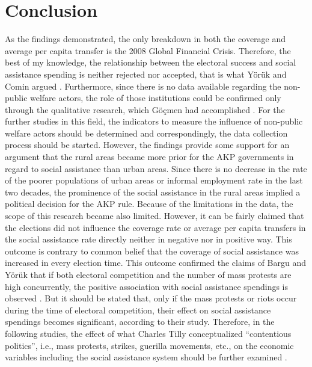\documentclass[11pt]{article}
\begin{document}
\section{Conclusion}

\noindent As the findings demonstrated, the only breakdown in both the coverage and average per capita transfer is the 2008 Global Financial Crisis. Therefore, the best of my knowledge, the relationship between the electoral success and social assistance spending is neither rejected nor accepted, that is what Yörük and Comin argued \cite{yoruk2020electoral}. Furthermore, since there is no data available regarding the non-public welfare actors, the role of those institutions could be confirmed only through the qualitative research, which Göçmen had accomplished \cite{goccmen2018non}. For the further studies in this field, the indicators to measure the influence of non-public welfare actors should be determined and correspondingly, the data collection process should be started. However, the findings provide some support for an argument that the rural areas became more prior for the AKP governments in regard to social assistance than urban areas. Since there is no decrease in the rate of the poorer populations of urban areas or informal employment rate in the last two decades, the prominence of the social assistance in the rural areas implied a political decision for the AKP rule. Because of the limitations in the data, the scope of this research became also limited. However, it can be fairly claimed that the elections did not influence the coverage rate or average per capita transfers in the social assistance rate directly neither in negative nor in positive way. This outcome is contrary to common belief that the coverage of social assistance was increased in every election time. This outcome confirmed the claims of Bargu and Yörük that if both electoral competition and the number of mass protests are high concurrently, the positive association with social assistance spendings is observed \cite{yorukbargu:2021}. But it should be stated that, only if the mass protests or riots occur during the time of electoral competition, their effect on social assistance spendings becomes significant, according to their study. Therefore, in the following studies, the effect of what Charles Tilly conceptualized “contentious politics”, i.e., mass protests, strikes, guerilla movements, etc., on the economic variables including the social assistance system should be further examined \cite{Tilly1988-jc}.
\end{document}
